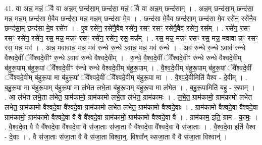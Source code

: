 \documentclass[17pt]{extarticle}
\begin{document}
41. वा अन्न॒ मन्नं॒ ॅवै वा अन्न॒म् छन्द॑सा॒म् छन्द॑सा॒ मन्नं॒ ॅवै वा अन्न॒म् छन्द॑साम् । . अन्न॒म् छन्द॑सा॒म् छन्द॑सा॒ मन्न॒ मन्न॒म् छन्द॑सा मे॒वैव छन्द॑सा॒ मन्न॒ मन्न॒म् छन्द॑सा मे॒व । . छन्द॑सा मे॒वैव छन्द॑सा॒म् छन्द॑सा मे॒व रसे॑न॒ रसे॑नै॒व छन्द॑सा॒म् छन्द॑सा मे॒व रसे॑न । . ए॒व रसे॑न॒ रसे॑नै॒वैव रसे॑न॒ रसꣳ॒॒ रसꣳ॒॒ रसे॑नै॒वैव रसे॑न॒ रस᳚म् । . रसे॑न॒ रसꣳ॒॒ रसꣳ॒॒ रसे॑न॒ रसे॑न॒ रस॒ मन्न॒ मन्नꣳ॒॒ रसꣳ॒॒ रसे॑न॒ रसे॑न॒ रस॒ मन्न᳚म् । . रस॒ मन्न॒ मन्नꣳ॒॒ रसꣳ॒॒ रस॒ मन्न॒ मवावा न्नꣳ॒॒ रसꣳ॒॒ रस॒ मन्न॒ मव॑ । . अन्न॒ मवावान्न॒ मन्न॒ मव॑ रुन्धे रु॒न्धे ऽवान्न॒ मन्न॒ मव॑ रुन्धे । . अव॑ रुन्धे रु॒न्धे ऽवाव॑ रुन्धे वैश्वदे॒वीं ॅवै᳚श्वदे॒वीꣳ रु॒न्धे ऽवाव॑ रुन्धे वैश्वदे॒वीम् । . रु॒न्धे॒ वै॒श्व॒दे॒वीं ॅवै᳚श्वदे॒वीꣳ रु॑न्धे रुन्धे वैश्वदे॒वीम् ब॑हुरू॒पाम् ब॑हुरू॒पां ॅवै᳚श्वदे॒वीꣳ रु॑न्धे रुन्धे वैश्वदे॒वीम् ब॑हुरू॒पाम् । . वै॒श्व॒दे॒वीम् ब॑हुरू॒पाम् ब॑हुरू॒पां ॅवै᳚श्वदे॒वीं ॅवै᳚श्वदे॒वीम् ब॑हुरू॒पा मा ब॑हुरू॒पां ॅवै᳚श्वदे॒वीं ॅवै᳚श्वदे॒वीम् ब॑हुरू॒पा मा । . वै॒श्व॒दे॒वीमिति॑ वैश्व - दे॒वीम् । . ब॒हु॒रू॒पा मा ब॑हुरू॒पाम् ब॑हुरू॒पा मा ल॑भेत लभे॒ता ब॑हुरू॒पाम् ब॑हुरू॒पा मा ल॑भेत । . ब॒हु॒रू॒पामिति॑ बहु - रू॒पाम् । . आ ल॑भेत लभे॒ता ल॑भेत॒ ग्राम॑कामो॒ ग्राम॑कामो लभे॒ता ल॑भेत॒ ग्राम॑कामः । . ल॒भे॒त॒ ग्राम॑कामो॒ ग्राम॑कामो लभेत लभेत॒ ग्राम॑कामो वैश्वदे॒वा वै᳚श्वदे॒वा ग्राम॑कामो लभेत लभेत॒ ग्राम॑कामो वैश्वदे॒वाः । . ग्राम॑कामो वैश्वदे॒वा वै᳚श्वदे॒वा ग्राम॑कामो॒ ग्राम॑कामो वैश्वदे॒वा वै वै वै᳚श्वदे॒वा ग्राम॑कामो॒ ग्राम॑कामो वैश्वदे॒वा वै । . ग्राम॑काम॒ इति॒ ग्राम॑ - का॒मः॒ । . वै॒श्व॒दे॒वा वै वै वै᳚श्वदे॒वा वै᳚श्वदे॒वा वै स॑जा॒ताः स॑जा॒ता वै वै᳚श्वदे॒वा वै᳚श्वदे॒वा वै स॑जा॒ताः । . वै॒श्व॒दे॒वा इति॑ वैश्व - दे॒वाः । . वै स॑जा॒ताः स॑जा॒ता वै वै स॑जा॒ता विश्वा॒न्॒. विश्वा᳚न् थ्सजा॒ता वै वै स॑जा॒ता विश्वान्॑ । \newline
\pagebreak
{}
\end{document}
